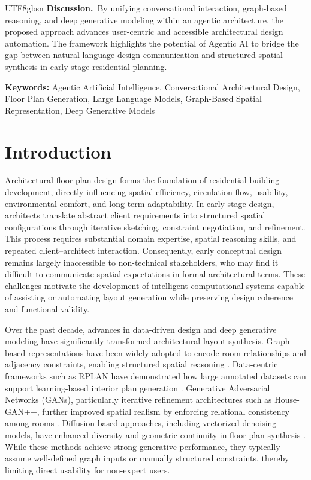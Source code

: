 \documentclass[11pt]{article}
\let\cite\citep
\renewenvironment{abstract}
  {{\bfseries\noindent{\abstractname}\par\nobreak}\footnotesize}
  {\bigskip}
\providecommand\citep{\cite}
\begin{document}
\begin{CJK}{UTF8}{gbsn}
\begin{abstract}
\textbf{Discussion.}~By unifying conversational interaction, graph-based reasoning, and deep generative modeling within an agentic architecture, the proposed approach advances user-centric and accessible architectural design automation. The framework highlights the potential of Agentic AI to bridge the gap between natural language design communication and structured spatial synthesis in early-stage residential planning.

\end{abstract}

\vspace{0.5em}
\noindent \textbf{Keywords:} Agentic Artificial Intelligence, Conversational Architectural Design, Floor Plan Generation, Large Language Models, Graph-Based Spatial Representation, Deep Generative Models
\vspace{1em}

\sloppy

\section*{Introduction}

Architectural floor plan design forms the foundation of residential building development, directly influencing spatial efficiency, circulation flow, usability, environmental comfort, and long-term adaptability. In early-stage design, architects translate abstract client requirements into structured spatial configurations through iterative sketching, constraint negotiation, and refinement. This process requires substantial domain expertise, spatial reasoning skills, and repeated client–architect interaction. Consequently, early conceptual design remains largely inaccessible to non-technical stakeholders, who may find it difficult to communicate spatial expectations in formal architectural terms. These challenges motivate the development of intelligent computational systems capable of assisting or automating layout generation while preserving design coherence and functional validity.

Over the past decade, advances in data-driven design and deep generative modeling have significantly transformed architectural layout synthesis. Graph-based representations have been widely adopted to encode room relationships and adjacency constraints, enabling structured spatial reasoning \cite{b19}. Data-centric frameworks such as RPLAN have demonstrated how large annotated datasets can support learning-based interior plan generation \cite{b18}. Generative Adversarial Networks (GANs), particularly iterative refinement architectures such as House-GAN++, further improved spatial realism by enforcing relational consistency among rooms \cite{b16}. Diffusion-based approaches, including vectorized denoising models, have enhanced diversity and geometric continuity in floor plan synthesis \cite{b17}. While these methods achieve strong generative performance, they typically assume well-defined graph inputs or manually structured constraints, thereby limiting direct usability for non-expert users.


\end{CJK}
\end{document}
